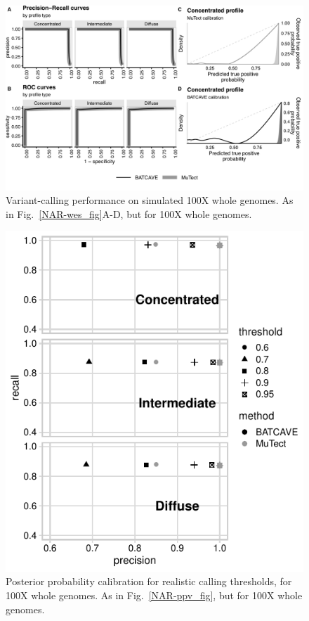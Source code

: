 \documentclass[a4,center,fleqn]{NAR}
\begin{document}
\begin{figure} [H]
\centering
  \includegraphics[width=\textwidth]{figures/fig_wgs.png}
  \caption{Variant-calling performance on  simulated 100X whole genomes. As in Fig.~\ref{NAR-wes_fig}A-D, but for 100X whole genomes.}
\label{NAR-wgs_fig}
\end{figure}

\begin{figure} [H]
\centering
  \includegraphics{figures/ppv_wgs.pdf}
  \caption{Posterior probability calibration for realistic calling thresholds, for 100X whole genomes. As in Fig.~\ref{NAR-ppv_fig}, but for 100X whole genomes.}
\label{NAR-ppv_wgs_fig}
\end{figure}
\end{document}
